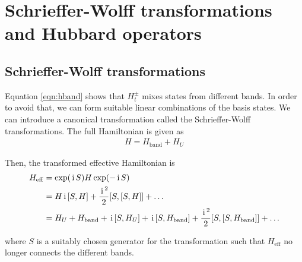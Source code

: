 \documentclass[]{report}
\newcommand{\I}{\,\mathrm{i}\,}
\begin{document}
\chapter{Schrieffer-Wolff transformations and Hubbard operators}
\section{Schrieffer-Wolff transformations}
Equation \eqref{eqn:hband} shows that $ H^{\pm}_{t} $ mixes states from different bands. In order to avoid that, we can form suitable linear combinations of the basis states. We can introduce a canonical transformation called the Schrieffer-Wolff transformations. The full Hamiltonian is given as
\begin{align}
H = H_{\mathrm{band}} + H_U
\end{align}

Then, the transformed effective Hamiltonian is
\begin{align}
\nonumber
H_{\mathrm{eff}} &= \exp(\I S) H \exp(-\I S)\\
\nonumber
&= H \I \comm{S}{H} + \frac{\I^2}{2} \comm{S}{\comm{S}{H}} + \dots\\
&= H_U + H_{\mathrm{band}} + \I \comm{S}{H_U} + \I \comm{S}{H_{\mathrm{band}}} + \frac{\I^2}{2} \comm{S}{\comm{S}{H_{\mathrm{band}}  }} + \dots
\end{align}

where $ S $ is a suitably chosen generator for the transformation such that $ H_{\mathrm{eff}} $ no longer connects the different bands.
\end{document}
